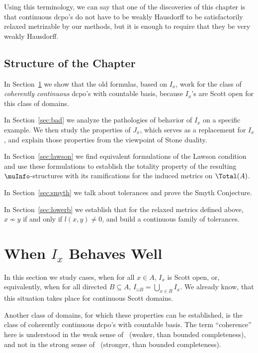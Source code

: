 Using this terminology, we can say that one of the discoveries
of this chapter is that continuous dcpo's do not have to be
weakly Hausdorff to be satisfactorily 
relaxed metrizable by our methods,
but it is enough to require that they be very weakly Hausdorff.

\subsection{Structure of the Chapter}

In Section~\ref{sec:good} we show that the old formulas, based on $I_x$,
work for the class of {\em coherently continuous} dcpo's with countable
basis,
because $I_x$'s are Scott open for this class of domains.

In Section~\ref{sec:bad} we analyze the pathologies of behavior
of $I_x$ on a specific example. We then study the properties of
$J_x$, which serves as a replacement for $I_x$, and explain those
properties from the viewpoint of Stone duality.

In Section~\ref{sec:lawson} we find equivalent formulations of
the Lawson condition and use these formulations to establish the
totality property of the resulting $\muInfo$-structures
with its ramifications for the induced metrics on $\Total(A)$.

In Section~\ref{sec:smyth} we talk about tolerances and prove
the Smyth Conjecture.

In Section~\ref{sec:lowerb} we establish that for the relaxed
metrics defined above, $x \not\sim y$ if and only if $l(x,y) \neq 0$,
and build a continuous family of tolerances.

\section{When $I_x$ Behaves Well}\label{sec:good}

In this section we study cases, when for all $x \in A$, $I_x$ is Scott open,
or, equivalently, when for all directed $B \subseteq A$,
$I_{\sqcup B} = \bigcup_{x \in B} I_x$. We already know, that this
situation takes place for continuous Scott domains.

Another class of domains, for which these properties can be established,
is the class of coherently continuous dcpo's with countable basis.
The term ``coherence'' here is understood in the weak sense
of~\cite{Abramsky} (weaker, than bounded completeness), and not in the
strong sense of~\cite{Gunter} (stronger, than bounded completeness).

